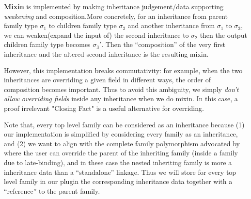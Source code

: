 



\textbf{Mixin} is implemented by making inheritance judgement/data supporting \textit{weakening} and composition.More concretely,  for an inheritance from parent family type $\sigma_1$ to children family type ${\sigma_2}$ and another inheritance from ${\sigma_1}$ to ${\sigma_3}$, we can weaken(expand the input of) the second inheritance to ${\sigma_2}$ then the output children family type becomes ${\sigma_3'}$. Then the ``composition'' of the very first inheritance and the altered second inheritance is the resulting mixin. 

However, this implementation breaks commutativity: for example, when the two inheritances are overriding a given field in different ways, the order of composition becomes important. Thus to avoid this ambiguity, we simply \textit{don't allow overriding fields} inside any inheritance when we do mixin. In this case, a proof irrelevant "Closing Fact" is a useful alternative for overriding.

Note that, every top level family can be considered as an inheritance because (1) our implementation is simplified by considering every family as an inheritance, and (2) we want to align with the complete family polymorphism advocated by \citet{zm2017} where the user can override the parent of the inheriting family (inside a family due to late-binding), and in these case the nested inheriting family is more a inheritance data than a ``standalone'' linkage. Thus we will store for every top level family in our plugin the corresponding inheritance data together with a ``reference'' to the parent family. 





